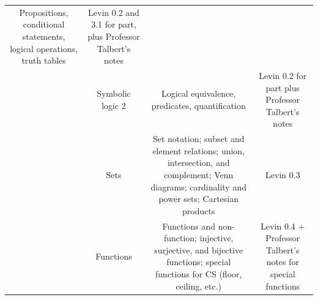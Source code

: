 \documentclass[]{article}
\begin{document}
\begin{longtable}[]{@{}cccc@{}}
\begin{minipage}[t]{0.22\columnwidth}
Propositions, conditional statements, logical operations, truth
tables\strut
\end{minipage} & \begin{minipage}[t]{0.22\columnwidth}\centering
Levin 0.2 and 3.1 for part, plus Professor Talbert's notes\strut
\end{minipage}\tabularnewline
\begin{minipage}[t]{0.22\columnwidth}\centering
4\strut
\end{minipage} & \begin{minipage}[t]{0.22\columnwidth}\centering
Symbolic logic 2\strut
\end{minipage} & \begin{minipage}[t]{0.22\columnwidth}\centering
Logical equivalence, predicates, quantification\strut
\end{minipage} & \begin{minipage}[t]{0.22\columnwidth}\centering
Levin 0.2 for part plus Professor Talbert's notes\strut
\end{minipage}\tabularnewline
\begin{minipage}[t]{0.22\columnwidth}\centering
5\strut
\end{minipage} & \begin{minipage}[t]{0.22\columnwidth}\centering
Sets\strut
\end{minipage} & \begin{minipage}[t]{0.22\columnwidth}\centering
Set notation; subset and element relations; union, intersection, and
complement; Venn diagrams; cardinality and power sets; Cartesian
products\strut
\end{minipage} & \begin{minipage}[t]{0.22\columnwidth}\centering
Levin 0.3\strut
\end{minipage}\tabularnewline
\begin{minipage}[t]{0.22\columnwidth}\centering
6\strut
\end{minipage} & \begin{minipage}[t]{0.22\columnwidth}\centering
Functions\strut
\end{minipage} & \begin{minipage}[t]{0.22\columnwidth}\centering
Functions and non-function; injective, surjective, and bijective
functions; special functions for CS (floor, ceiling, etc.)\strut
\end{minipage} & \begin{minipage}[t]{0.22\columnwidth}\centering
Levin 0.4 + Professor Talbert's notes for special functions\strut

\end{minipage}
\end{longtable}
\end{document}
